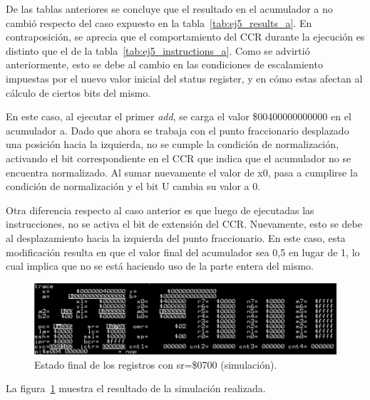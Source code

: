 De las tablas anteriores se concluye que el resultado en el acumulador a no cambió respecto del caso expuesto en la tabla~\ref{tab:ej5_results_a}. En contraposición, se aprecia que el comportamiento del CCR durante la ejecución es distinto que el de la tabla~\ref{tab:ej5_instructions_a}. Como se advirtió anteriormente, esto se debe al cambio en las condiciones de escalamiento impuestas por el nuevo valor inicial del status register, y en cómo estas afectan al cálculo de ciertos bits del mismo.

En este caso, al ejecutar el primer \textit{add}, se carga el valor \$00400000000000 en el acumulador a. Dado que ahora se trabaja con el punto fraccionario desplazado una posición hacia la izquierda, no se cumple la condición de normalización, activando el bit correspondiente en el CCR que indica que el acumulador no se encuentra normalizado. Al sumar nuevamente el valor de x0, pasa a cumplirse la condición de normalización y el bit U cambia su valor a 0.

Otra diferencia respecto al caso anterior es que luego de ejecutadas las instrucciones, no se activa el bit de extensión del CCR. Nuevamente, esto se debe al desplazamiento hacia la izquierda del punto fraccionario. En este caso, esta modificación resulta en que el valor final del acumulador sea 0,5 en lugar de 1, lo cual implica que no se está haciendo uso de la parte entera del mismo.


\begin{figure}[H]
    \centering
    \includegraphics[width=\textwidth]{figs/ej5/ej5_3_b.png}
    \caption{Estado final de los registros con sr=\$0700 (simulación).}
    \label{fig:ej5_simregs_b}
\end{figure}

La figura~\ref{fig:ej5_simregs_b} muestra el resultado de la simulación realizada.
